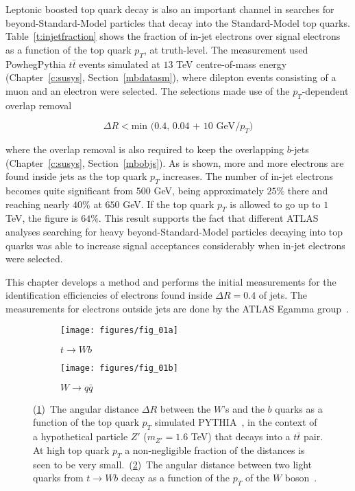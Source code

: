 \vspace{3mm}

Leptonic boosted top quark decay is also an important
channel in searches for beyond-Standard-Model particles that decay into the
Standard-Model top quarks. Table~\ref{t:injetfraction} shows the fraction of
in-jet electrons over signal electrons as a function of the top quark $p_T$, at
truth-level. The measurement used PowhegPythia $t\bar{t}$ events simulated at
$13$ TeV centre-of-mass energy (Chapter~\ref{c:susys}, Section~\ref{mbdatasm}),
where dilepton events consisting of a muon and an electron were selected. The
selections made use of the $p_T$-dependent overlap removal

\begin{equation}\label{c7overlapr}
	\Delta R <  \text{min (0.4, 0.04 + 10 GeV} / p_T)
\end{equation}

where the overlap removal is also required to keep the overlapping $b$-jets
(Chapter~\ref{c:susys}, Section~\ref{mbobjs}). As is shown, more and more
electrons are found inside jets as the top quark $p_T$ increases. The number of
in-jet electrons becomes quite significant from $500$ GeV, being approximately
$25\%$ there and reaching nearly $40\%$ at $650$ GeV. If the top quark $p_T$ is
allowed to go up to $1$ TeV, the figure is $64\%$. This result supports the
fact that different ATLAS analyses searching for heavy beyond-Standard-Model
particles decaying into top quarks was able to increase signal acceptances
considerably when in-jet electrons were selected.

This chapter develops a method and performs the initial measurements for the
identification efficiencies of electrons found inside $\Delta R=0.4$ of jets.
The measurements for electrons outside jets are done by the ATLAS Egamma
group~\cite{atlaselcid, eleffme}.

\begin{figure}[H]

	\begin{subfigure}{0.5\textwidth}
		\texttt{[image: figures/fig\_01a]}
		\caption{$t\to Wb$}
		\label{drwbtoppta}
	\end{subfigure}
	\begin{subfigure}{0.5\textwidth}
		\texttt{[image: figures/fig\_01b]}
		\caption{$W\to q\bar{q}$}
		\label{drwbtopptb}
	\end{subfigure}

	\centering
	\caption{(\ref{drwbtoppta})~The angular distance $\Delta R$ between
		the $W$'s and the $b$ quarks as a function of the top quark $p_T$ simulated
		PYTHIA~\cite{sjostrand:ch7}, in the context of a hypothetical particle $Z'$
		($m_{Z'}=1.6$ TeV) that decays into a $t\bar{t}$ pair. At high top quark $p_T$
		a non-negligible fraction of the distances is seen to be very
		small.~(\ref{drwbtopptb})~The angular distance between two light quarks from
		$t\to Wb$ decay as a function of the $p_T$ of the $W$ boson~\cite{bdis-figs}.}
	\label{f:drwbtoppt}
\end{figure}



